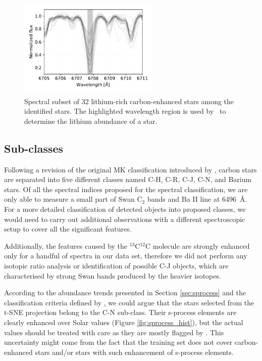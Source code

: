 \begin{figure}
	\centering
	\includegraphics[width=0.6\textwidth]{li_string_ch.pdf}
	\caption{Spectral subset of 32 lithium-rich carbon-enhanced stars among the identified stars. The highlighted wavelength region is used by \TC\ to determine the lithium abundance of a star.}
	\label{fig:li_abund}
\end{figure}

\subsection{Sub-classes}
\label{sec:subclasses}
Following a revision of the original MK classification \citep{1941ApJ....94..501K} introduced by \citet{1996ApJS..105..419B}, carbon stars are separated into five different classes named \mbox{C-H}, \mbox{C-R}, \mbox{C-J}, \mbox{C-N}, and Barium stars. Of all the spectral indices proposed for the spectral classification, we are only able to measure a small part of Swan C$_2$ bands and Ba II line at 6496~\AA. For a more detailed classification of detected objects into proposed classes, we would need to carry out additional observations with a different spectroscopic setup to cover all the significant features. 

Additionally, the features caused by the $^{13}$C$^{12}$C molecule are strongly enhanced only for a handful of spectra in our data set, therefore we did not perform any isotopic ratio analysis or identification of possible C-J objects, which are characterised by strong Swan bands produced by the heavier isotopes.

According to the abundance trends presented in Section \ref{sec:sprocess} and the classification criteria defined by \citet{1996ApJS..105..419B}, we could argue that the stars selected from the t-SNE projection belong to the C-N sub-class. Their s-process elements are clearly enhanced over Solar values (Figure \ref{fig:sprocess_hist}), but the actual values should be treated with care as they are mostly flagged by \TC. This uncertainty might come from the fact that the training set does not cover carbon-enhanced stars and/or stars with such enhancement of s-process elements.

